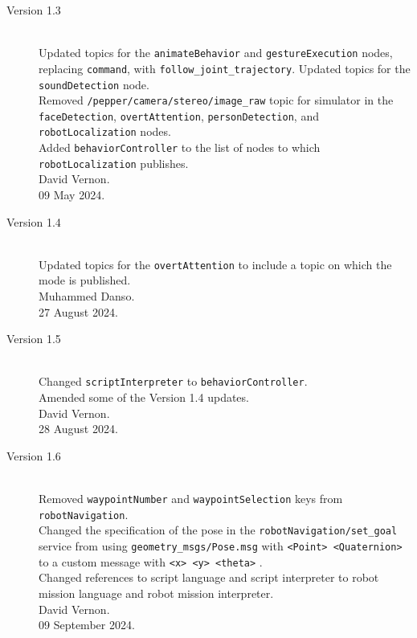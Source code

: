 \documentclass{CSSRforAfrica}
\begin{document}
{\begin{description}
\item [Version 1.3]~\\
Updated topics for the  {\small \verb+animateBehavior+} and  {\small \verb+gestureExecution+}  nodes, replacing {\small \verb+command+}, with {\small \verb+follow_joint_trajectory+}. Updated topics for the {\small \verb+soundDetection+} node.\\
Removed  {\small \verb+/pepper/camera/stereo/image_raw+} topic for simulator in the  {\small \verb+faceDetection+},  {\small \verb+overtAttention+},  {\small \verb+personDetection+}, and  {\small \verb+robotLocalization+}    nodes.\\
Added {\footnotesize \verb+behaviorController+} to the list of nodes to which {\footnotesize \verb+robotLocalization+} publishes.\\
David Vernon. \\                          
09  May 2024.

\item [Version 1.4]~\\
Updated topics for the  {\small \verb+overtAttention+}  to include a topic on which the mode is published.\\
Muhammed Danso. \\                          
27 August 2024.


\item [Version 1.5]~\\
Changed  {\small \verb+scriptInterpreter+}  to {\small \verb+behaviorController+}.\\
Amended some of the Version 1.4 updates.\\
David Vernon. \\                          
28 August 2024.

\item [Version 1.6]~\\
Removed   {\small \verb+waypointNumber+}  and {\small \verb+waypointSelection+} keys  from  {\small \verb+robotNavigation+}. \\
Changed the specification of the pose in the {\small \verb+robotNavigation/set_goal+} service from using {\small \verb+geometry_msgs/Pose.msg+} with {\small \verb+<Point> <Quaternion>+}  to a custom message with  {\small \verb+<x> <y> <theta>+} .\\
Changed references to script language and script interpreter to robot mission language and robot mission interpreter.\\
David Vernon. \\                          
09 September 2024.


\end{description}}
\end{document}
